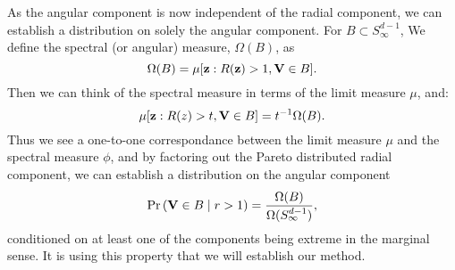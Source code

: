 As the angular component is now independent of the radial component, we can establish a distribution
  on solely the angular component.  For  $B\subset S_{\infty}^{d-1}$, We define the spectral
  (or angular) measure, $\Omega(B)$, as
  \begin{equation}
    \Omega(B) = \mu[{\bf z}: R({\bf z}) > 1, {\bf V} \in B].
  \end{equation}
  Then we can think of the spectral measure in terms of the limit measure $\mu$, and:
  \begin{equation}
    \mu[{\bf z}:R(z)>t, {\bf V}\in B] = t^{-1}\Omega(B).
  \end{equation}
  Thus we see a one-to-one correspondance between the limit measure $\mu$ and the
    spectral measure $\phi$, and by factoring out the Pareto distributed radial
    component, we can establish a distribution on the angular component
  \begin{equation}
    \text{Pr}\left({\bf V} \in B \mid r > 1\right) = \frac{\Omega(B)}{\Omega(S_{\infty}^{d-1})},
  \end{equation}
  conditioned on at least one of the components being extreme in the marginal
  sense.  It is using this property that we will establish our method.

